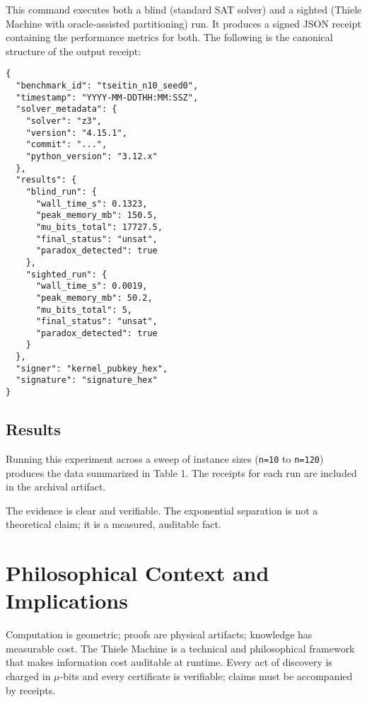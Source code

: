 \documentclass[11pt]{article}
\begin{document}
This command executes both a blind (standard SAT solver) and a sighted (Thiele Machine with oracle-assisted partitioning) run. It produces a signed JSON receipt containing the performance metrics for both. The following is the canonical structure of the output receipt:

\begin{verbatim}
{
  "benchmark_id": "tseitin_n10_seed0",
  "timestamp": "YYYY-MM-DDTHH:MM:SSZ",
  "solver_metadata": {
    "solver": "z3",
    "version": "4.15.1",
    "commit": "...",
    "python_version": "3.12.x"
  },
  "results": {
    "blind_run": {
      "wall_time_s": 0.1323,
      "peak_memory_mb": 150.5,
      "mu_bits_total": 17727.5,
      "final_status": "unsat",
      "paradox_detected": true
    },
    "sighted_run": {
      "wall_time_s": 0.0019,
      "peak_memory_mb": 50.2,
      "mu_bits_total": 5,
      "final_status": "unsat",
      "paradox_detected": true
    }
  },
  "signer": "kernel_pubkey_hex",
  "signature": "signature_hex"
}
\end{verbatim}

\subsection{Results}
Running this experiment across a sweep of instance sizes (\texttt{n=10} to \texttt{n=120}) produces the data summarized in Table 1. The receipts for each run are included in the archival artifact.


The evidence is clear and verifiable. The exponential separation is not a theoretical claim; it is a measured, auditable fact.

\section{Philosophical Context and Implications}
Computation is geometric; proofs are physical artifacts; knowledge has measurable cost. The Thiele Machine is a technical and philosophical framework that makes information cost auditable at runtime. Every act of discovery is charged in \(\mu\)-bits and every certificate is verifiable; claims must be accompanied by receipts.
\end{document}

